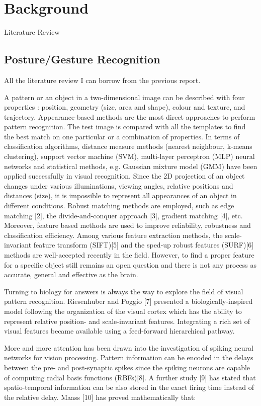 \chapter{Background}
\label{cha:bkg}
Literature Review

\section{Posture/Gesture Recognition}
\label{sec:pgr}
All the literature review I can borrow from the previous report.

A pattern or an object in a two-dimensional image can be described with four properties \cite{wysoski2008fast}: position, geometry (size, area and shape), colour and texture, and trajectory. 
Appearance-based methods are the most direct approaches to perform pattern recognition. 
The test image is compared with all the templates to find the best match on one particular or a combination of properties. 
In terms of classification algorithms, distance measure methods (nearest neighbour, k-means clustering), support vector machine (SVM), multi-layer perceptron (MLP) neural networks and statistical methods, e.g. Gaussian mixture model (GMM) have been applied successfully in visual recognition. 
Since the 2D projection of an object changes under various illuminations, viewing angles, relative positions and distances (size), it is impossible to represent all appearances of an object in different conditions. 
Robust matching methods are employed, such as edge matching [2], the divide-and-conquer approach [3], gradient matching [4], etc. 
Moreover, feature based methods are used to improve reliability, robustness and classification efficiency. 
Among various feature extraction methods, the scale-invariant feature transform (SIFT)[5] and the sped-up robust features (SURF)[6] methods are well-accepted recently in the field. 
However, to find a proper feature for a specific object still remains an open question and there is not any process as accurate, general and effective as the brain.

Turning to biology for answers is always the way to explore the field of visual pattern recognition. 
Riesenhuber and Poggio [7] presented a biologically-inspired model following the organization of the visual cortex which has the ability to represent relative position- and scale-invariant features. 
Integrating a rich set of visual features became available using a feed-forward hierarchical pathway. 

More and more attention has been drawn into the investigation of spiking neural networks for vision processing. 
Pattern information can be encoded in the delays between the pre- and post-synaptic spikes since the spiking neurons are capable of computing radial basis functions (RBFs)[8].  
A further study [9] has stated that spatio-temporal information can be also stored in the exact firing time instead of the relative delay. Maass [10] has proved mathematically that:


